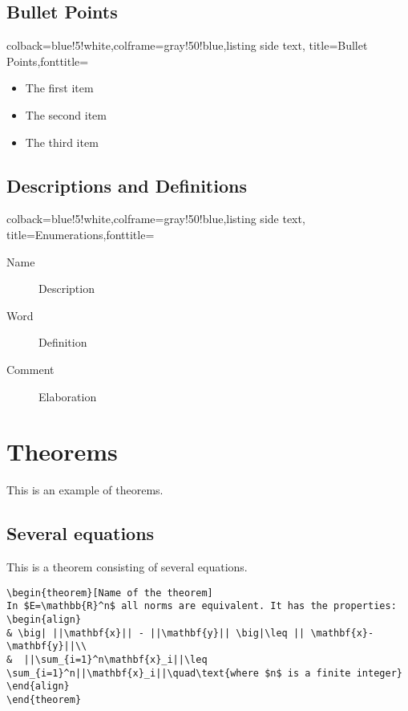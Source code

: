 \subsection{Bullet Points}

\begin{tcblisting}{colback=blue!5!white,colframe=gray!50!blue,listing side text,
  title=Bullet Points,fonttitle=\bfseries}
\begin{itemize}
\item The first item
\item The second item
\item The third item
\end{itemize}
\end{tcblisting}

\subsection{Descriptions and Definitions}

\begin{tcblisting}{colback=blue!5!white,colframe=gray!50!blue,listing side text,
  title=Enumerations,fonttitle=\bfseries}
\begin{description}
\item[Name] Description
\item[Word] Definition
\item[Comment] Elaboration
\end{description}
\end{tcblisting}



\section{Theorems}

This is an example of theorems.

\subsection{Several equations}
This is a theorem consisting of several equations.

\begin{verbatim}
\begin{theorem}[Name of the theorem]
In $E=\mathbb{R}^n$ all norms are equivalent. It has the properties:
\begin{align}
& \big| ||\mathbf{x}|| - ||\mathbf{y}|| \big|\leq || \mathbf{x}- \mathbf{y}||\\
&  ||\sum_{i=1}^n\mathbf{x}_i||\leq \sum_{i=1}^n||\mathbf{x}_i||\quad\text{where $n$ is a finite integer}
\end{align}
\end{theorem}
\end{verbatim}

